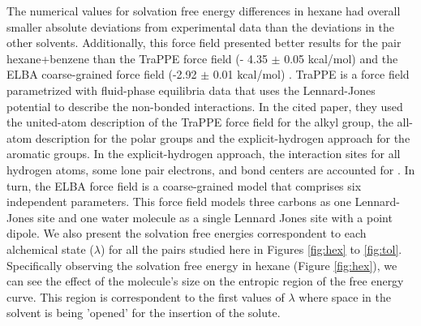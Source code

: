 The numerical values for solvation free energy differences in hexane had overall smaller absolute deviations from experimental data than the deviations in the other solvents. Additionally, this force field presented better results for the pair hexane+benzene than the TraPPE force field (- 4.35  $\pm$ 0.05 kcal/mol) \cite{garrido2011} and the ELBA coarse-grained force field  (-2.92 $\pm$ 0.01 kcal/mol) \cite{doi:10.1021/acs.jctc.5b00963}. TraPPE is a force field parametrized with fluid-phase equilibria data that uses the Lennard-Jones potential to describe the non-bonded interactions. In the cited paper, they used the united-atom description of the TraPPE force field for the alkyl group, the all-atom description for the polar groups and the explicit-hydrogen approach for the aromatic groups. In the explicit-hydrogen approach, the interaction sites for all hydrogen atoms, some lone pair electrons, and bond centers are accounted for \cite{doi:10.1021/jp073586l}. In turn, the ELBA force field is a coarse-grained model that comprises six independent parameters. This force field models three carbons as one Lennard-Jones site and one water molecule as a single Lennard Jones site with a point dipole. We also present the solvation free energies correspondent to each alchemical state ($\lambda$) for all the pairs studied here in Figures \ref{fig:hex} to \ref{fig:tol}. Specifically observing the solvation free energy in hexane (Figure \ref{fig:hex}), we can see the effect of the molecule's size on the entropic region of the free energy curve. This region is correspondent to the first values of $\lambda$ where space in the solvent is being 'opened' for the insertion of the solute.

